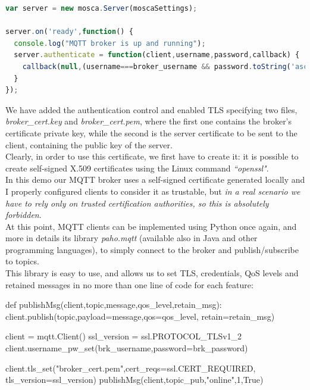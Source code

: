 \documentclass[12pt]{report}
\begin{document}
{{\begin{center}
\begin{lstlisting}[language=javascript,caption=Mosca broker security settings]
var server = new mosca.Server(moscaSettings);

server.on('ready',function() {
  console.log("MQTT broker is up and running");
  server.authenticate = function(client,username,password,callback) {
    callback(null,(username===broker_username && password.toString('ascii')===broker_password))
  }
});
\end{lstlisting}
\end{center}

We have added the authentication control and enabled TLS specifying two files, \emph{broker\_cert.key} and \emph{broker\_cert.pem}, where the first one contains the broker's certificate private key, while the second is the server certificate to be sent to the client, containing the public key of the server.\\
Clearly, in order to use this certificate, we first have to create it: it is possible to create self-signed X.509 certificates using the Linux command \emph{``openssl"}.\\

In this demo our MQTT broker uses a self-signed certificate generated locally and I properly configured clients to consider it as trustable, but \emph{in a real scenario we have to rely only on trusted certification authorities, so this is absolutely forbidden}.\\

At this point, MQTT clients can be implemented using Python once again, and more in details its library \emph{paho.mqtt} (available also in Java and other programming languages), to simply connect to the broker and publish/subscribe to topics.\\
This library is easy to use, and allows us to set TLS, credentials, QoS levels and retained messages in no more than one line of code for each feature:\\

\begin{python}
def publishMsg(client,topic,message,qos_level,retain_msg):
  client.publish(topic,payload=message,qos=qos_level,             retain=retain_msg)

client = mqtt.Client()
ssl_version = ssl.PROTOCOL_TLSv1_2
client.username_pw_set(brk_username,password=brk_password)

client.tls_set("broker_cert.pem",cert_reqs=ssl.CERT_REQUIRED,  tls_version=ssl_version)
publishMsg(client,topic_pub,"online",1,True)
\end{python}


}}
\end{document}
